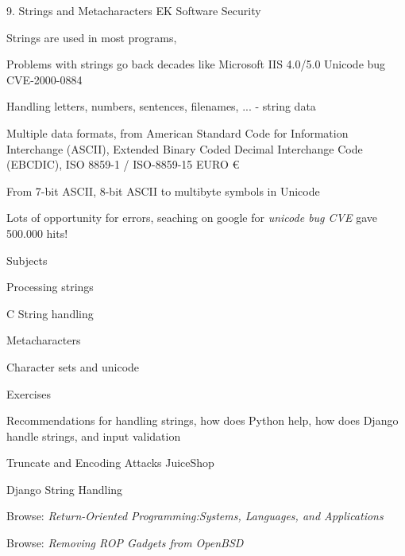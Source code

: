 \documentclass[Screen16to9,17pt]{foils}
\begin{document}
\mytitlepage
{9. Strings and Metacharacters}
{EK  Software Security}



\begin{list1}
\item Strings are used in most programs,
\item Problems with strings go back decades like Microsoft IIS 4.0/5.0 Unicode bug CVE-2000-0884
\item Handling letters, numbers, sentences, filenames, ... - string data
\item Multiple data formats, from American Standard Code for Information Interchange (ASCII), Extended Binary Coded Decimal Interchange Code (EBCDIC), ISO 8859-1 / ISO-8859-15 EURO €
\item From 7-bit ASCII, 8-bit ASCII to multibyte symbols in Unicode
\item Lots of opportunity for errors, seaching on google for \emph{unicode bug CVE} gave 500.000 hits!
\end{list1}


\begin{list1}
\item Subjects
\begin{list2}
\item Processing strings
\item C String handling
\item Metacharacters
\item Character sets and unicode
\end{list2}
\item Exercises
\begin{list2}
\item Recommendations for handling strings, how does Python help, how does Django handle strings, and input validation
\item Truncate and Encoding Attacks JuiceShop
\item Django String Handling
\end{list2}
\end{list1}


\begin{list1}
\item Browse: \emph{Return-Oriented Programming:Systems, Languages, and Applications}
\item Browse: \emph{Removing ROP Gadgets from OpenBSD}
\end{list1}
\end{document}
